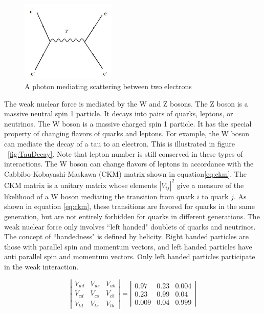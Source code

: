 \documentclass[oneside, letterpaper, oldfontcommands]{memoir}
\begin{document}
\begin{figure}[here]
\includegraphics[width=0.4\textwidth]{eeScattering.jpg}
\caption{A photon mediating scattering between two electrons}
\label{fig:eeScattering}
\end{figure}


\qquad The weak nuclear force is mediated by the W and Z bosons. The Z boson is a massive neutral spin 1 particle. It decays into pairs of quarks, leptons, or neutrinos. The W boson is a massive charged spin 1 particle. It has the special property of changing flavors of quarks and leptons. For example, the W boson can mediate the decay of a tau to an electron. This is illustrated in figure ~\ref{fig:TauDecay}. Note that lepton number is still conserved in these types of interactions. The W boson can change flavors of leptons in accordance with the Cabbibo-Kobayashi-Maskawa (CKM) matrix\cite{Agashe:2014kda} shown in equation\ref{eq:ckm}. The CKM matrix is a unitary matrix whose elements $|V_{ij}|^{2}$ give a measure of the likelihood of a W boson mediating the transition from quark $i$ to quark $j$. As shown in equation \ref{eq:ckm}, these transitions are favored for quarks in the same generation, but are not entirely forbidden for quarks in different generations. The weak nuclear force only involves ``left handed" doublets of quarks and neutrinos. The concept of ``handedness" is defined by helicity. Right handed particles are those with parallel spin and momentum vectors, and left handed particles have anti parallel spin and momentum vectors. Only left handed particles participate in the weak interaction.

\begin{equation}
\label{eq:ckm}
\left| \begin{array}{ccc} V_{ud} & V_{us} & V_{ub} \\ V_{cd} & V_{cs} & V_{cb} \\ V_{td} & V_{ts} & V_{tb} \end{array} \right| = \left| \begin{array}{ccc} 0.97 & 0.23 & 0.004 \\ 0.23 & 0.99 & 0.04 \\ 0.009 & 0.04 & 0.999 \end{array} \right|
\end{equation}
\end{document}
